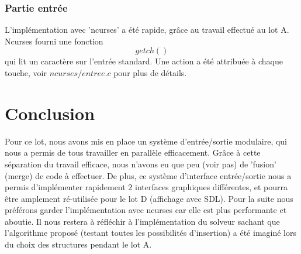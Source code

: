 \documentclass[10pt]{article}
\begin{document}
  \subsubsection{Partie entrée}
    L'implémentation avec 'ncurses' a été rapide, grâce au travail effectué au lot A. Ncurses fourni une fonction $$getch()$$ qui lit un caractère sur l'entrée standard. Une action a été attribuée à chaque touche,
    voir $ncurses/entree.c$ pour plus de détails.
  \section{Conclusion}
    Pour ce lot, nous avons mis en place un système d'entrée/sortie modulaire, qui nous a permis de tous travailler en parallèle efficacement.
    Grâce à cette séparation du travail efficace, nous n'avons eu que peu (voir pas) de 'fusion' (merge) de code à effectuer.
    De plus, ce système d'interface entrée/sortie nous a permis d'implémenter rapidement 2 interfaces graphiques différentes,
    et pourra être amplement ré-utilisée pour le lot D (affichage avec SDL). Pour la suite nous préférons garder l'implémentation avec ncurses car elle est plus performante et aboutie. 
    Il nous restera à réfléchir à l'implémentation du solveur sachant que l'algorithme proposé (testant toutes les possibilités d'insertion)
    a été imaginé lors du choix des structures pendant le lot A.

  
\end{document}
